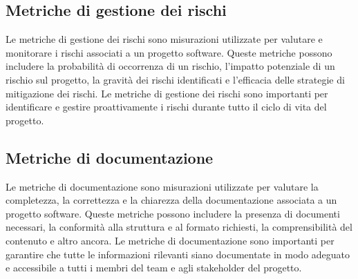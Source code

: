 \vspace{2em}
\subsection*{Metriche di gestione dei rischi}

Le metriche di gestione dei rischi sono misurazioni utilizzate per valutare e monitorare i rischi associati a un progetto software. Queste metriche possono includere la probabilità di occorrenza di un rischio, l'impatto potenziale di un rischio sul progetto, la gravità dei rischi identificati e l'efficacia delle strategie di mitigazione dei rischi. Le metriche di gestione dei rischi sono importanti per identificare e gestire proattivamente i rischi durante tutto il ciclo di vita del progetto.

\vspace{2em}
\subsection*{Metriche di documentazione}

Le metriche di documentazione sono misurazioni utilizzate per valutare la completezza, la correttezza e la chiarezza della documentazione associata a un progetto software. Queste metriche possono includere la presenza di documenti necessari, la conformità alla struttura e al formato richiesti, la comprensibilità del contenuto e altro ancora. Le metriche di documentazione sono importanti per garantire che tutte le informazioni rilevanti siano documentate in modo adeguato e accessibile a tutti i membri del team e agli stakeholder del progetto.
